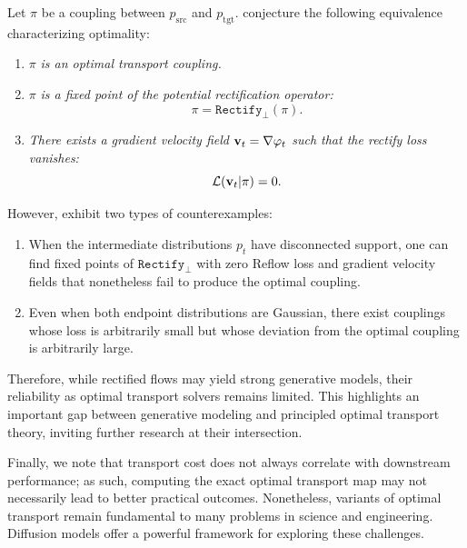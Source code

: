 Let $\pi$ be a coupling between $p_{\mathrm{src}}$ and $p_{\mathrm{tgt}}$. \citet{liu2022flow} conjecture the following equivalence characterizing optimality:
\begin{enumerate}[label=(\textit{\roman*})]
  \item $\pi$ \textit{is an optimal transport coupling.}
  \item $\pi$ \textit{is a fixed point of the potential rectification operator:}
  \[
    \pi = \texttt{Rectify}_{\perp}(\pi).
  \]
  \item \textit{There exists a gradient velocity field ${\mathbf{v}}_t = \nabla \varphi_t$ such that the rectify loss vanishes:}
  \[
    \mathcal{L}({\mathbf{v}}_t |\pi) = 0.
  \]
\end{enumerate}
However, \citet{hertrich2025relation} exhibit two types of counterexamples:
\begin{enumerate}
  \item When the intermediate distributions $p_t$ have disconnected support, one can find fixed points of $\texttt{Rectify}_{\perp}$ with zero Reflow loss and gradient velocity fields that nonetheless fail to produce the optimal coupling.
  \item Even when both endpoint distributions are Gaussian, there exist couplings whose loss is arbitrarily small but whose deviation from the optimal coupling is arbitrarily large.
\end{enumerate}

Therefore, while rectified flows may yield strong generative models, their reliability as optimal transport solvers remains limited. This highlights an important gap between generative modeling and principled optimal transport theory, inviting further research at their intersection.

Finally, we note that transport cost does not always correlate with downstream performance; as such, computing the exact optimal transport map may not necessarily lead to better practical outcomes. Nonetheless, variants of optimal transport remain fundamental to many problems in science and engineering. Diffusion models offer a powerful framework for exploring these challenges.

\newpage
